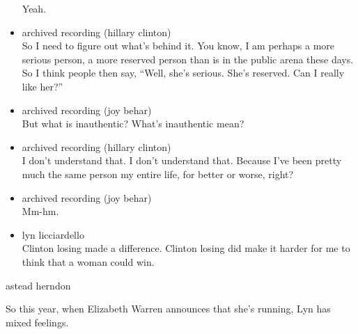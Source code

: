 \begin{itemize}
  Yeah.
\item
  archived recording (hillary clinton)\\
  So I need to figure out what's behind it. You know, I am perhaps a
  more serious person, a more reserved person than is in the public
  arena these days. So I think people then say, ``Well, she's serious.
  She's reserved. Can I really like her?''
\item
  archived recording (joy behar)\\
  But what is inauthentic? What's inauthentic mean?
\item
  archived recording (hillary clinton)\\
  I don't understand that. I don't understand that. Because I've been
  pretty much the same person my entire life, for better or worse,
  right?
\item
  archived recording (joy behar)\\
  Mm-hm.
\item
  lyn licciardello\\
  Clinton losing made a difference. Clinton losing did make it harder
  for me to think that a woman could win.
\end{itemize}

astead herndon

So this year, when Elizabeth Warren announces that she's running, Lyn
has mixed feelings.

